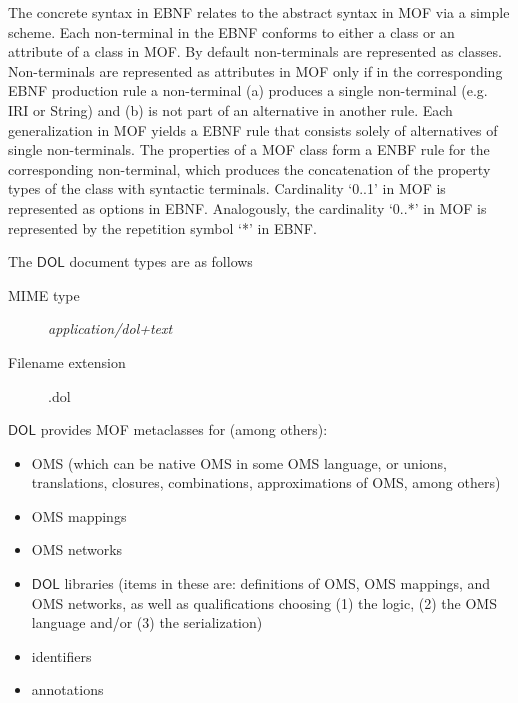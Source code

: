 \documentclass[10pt, a4paper]{isov2}
\newcommand{\red}[1]{#1} %
\newcommand*{\mimetype}[1]{\textit{#1}}
\newcommand*{\DOL}{\ensuremath{\mathsf{DOL}}\xspace}
\begin{document}
The concrete syntax in EBNF relates to the abstract syntax in MOF via a simple scheme. Each 
 non-terminal in the EBNF conforms to either a class or an attribute of a class in MOF.
By default non-terminals are represented as classes. Non-terminals are represented as attributes in MOF 
only if in the corresponding EBNF production rule a non-terminal (a) produces 
a single non-terminal  (e.g. IRI or String) and  
(b) is  not part of an alternative in another rule. 
Each generalization in MOF yields a EBNF rule that 
consists solely of alternatives of single non-terminals. 
The properties of a MOF class form a ENBF rule for the corresponding non-terminal, 
which produces the concatenation of the property types of the class with syntactic terminals.
Cardinality  `0..1' in MOF is  represented as options in EBNF.  Analogously, the cardinality 
`0..*' in MOF is represented by the repetition symbol `*' in EBNF.

\medskip
The \DOL document types are as follows
		\begin{description}
			\item[MIME type] \mimetype{application/dol+text}
			\item[Filename extension] .dol
		\end{description}


\label{s:mof-metaclasses}

\DOL provides MOF metaclasses for (among others):   
\begin{itemize}
\item OMS (which can be native OMS in some OMS language, or unions, translations,  closures, combinations, approximations of OMS, among others)
\item OMS mappings 
\item OMS networks
\item \DOL libraries (items in these are: definitions of OMS, OMS mappings, and OMS networks, as well as qualifications choosing (1) the logic,
(2) the OMS language and/or (3) the serialization)
\item identifiers
\item annotations
\end{itemize}
 
\end{document}
